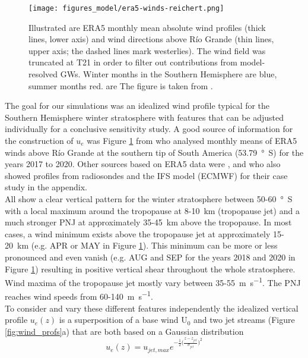 \begin{figure}[tbp]
    \centering
    \texttt{[image: figures\_model/era5-winds-reichert.png]}
    \caption{Illustrated are ERA5 monthly mean absolute wind profiles (thick lines, lower axis) and wind directions above Río Grande (thin lines, upper axis; the dashed lines mark westerlies). The wind field was truncated at T21 in order to filter out contributions from model-resolved GWs. Winter months in the Southern Hemisphere are blue, summer months red. are The figure is taken from \textcite[]{reichert_characterization_2022}.}
    \label{fig:era5-winds-reichert}
\end{figure} 
The goal for our simulations was an idealized wind profile typical for the Southern Hemisphere winter stratosphere with features that can be adjusted individually for a conclusive sensitivity study. A good source of information for the construction of $u_e$ was Figure \ref{fig:era5-winds-reichert} from \textcite[]{reichert_characterization_2022} who analysed monthly means of ERA5 winds above Río Grande at the southern tip of South America (\SI{53.79}{\degree S}) for the years 2017 to 2020. Other sources based on ERA5 data were \textcite[]{rapp_et_al_southtrac-gw_2021}, \textcite[]{mixa_nonlinear_2021} and \textcite[]{dornbrack_stratospheric_2022} who also showed profiles from radiosondes and the IFS model (ECMWF) for their case study in the appendix. \\
All show a clear vertical pattern for the winter stratosphere between 50-\SI{60}{\degree S} with a local maximum around the tropopause at 8-\SI{10}{\kilo\meter} (tropopause jet) and a much stronger PNJ at approximately 35-\SI{45}{\kilo\meter} above the tropopause. In most cases, a wind minimum exists above the tropopause jet at approximately 15-\SI{20}{\kilo\meter} (e.g. APR or MAY in Figure \ref{fig:era5-winds-reichert}). This minimum can be more or less pronounced and even vanish (e.g. AUG and SEP for the years 2018 and 2020 in Figure \ref{fig:era5-winds-reichert}) resulting in positive vertical shear throughout the whole stratosphere. Wind maxima of the tropopause jet mostly vary between 35-\SI{55}{\meter\per\second}. The PNJ reaches wind speeds from 60-\SI{140}{\meter\per\second}. \\
To consider and vary these different features independently the idealized vertical profile $u_e(z)$ is a superposition of a base wind U$_0$ and two jet streams (Figure \ref{fig:wind_profs}a) that are both based on a Gaussian distribution
\begin{equation}
    u_e(z) = u_{jet,max} e^{-\frac{1}{2} \bigl(\frac{z-z_{jet}}{\sigma_{jet}}\bigr)^2}
    \label{equ:wind-distribution}
\end{equation}
